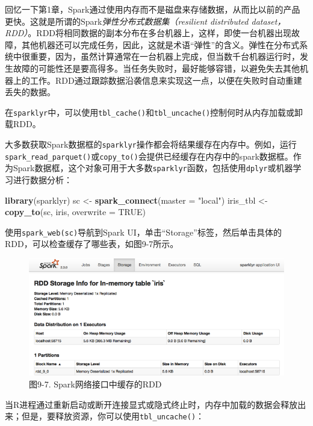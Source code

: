 \documentclass[
]{article}
\newenvironment{Shaded}{\begin{snugshade}}{\end{snugshade}}
\newcommand{\DataTypeTok}[1]{\textcolor[rgb]{0.13,0.29,0.53}{#1}}
\newcommand{\KeywordTok}[1]{\textcolor[rgb]{0.13,0.29,0.53}{\textbf{#1}}}
\newcommand{\NormalTok}[1]{#1}
\newcommand{\OtherTok}[1]{\textcolor[rgb]{0.56,0.35,0.01}{#1}}
\newcommand{\StringTok}[1]{\textcolor[rgb]{0.31,0.60,0.02}{#1}}
\begin{document}
回忆一下第1章，Spark通过使用内存而不是磁盘来存储数据，从而比以前的产品更快。这就是所谓的Spark\emph{弹性分布式数据集（resilient
distributed
dataset，RDD）}。RDD将相同数据的副本分布在多台机器上，这样，即使一台机器出现故障，其他机器还可以完成任务，因此，这就是术语``弹性''的含义。弹性在分布式系统中很重要，因为，虽然计算通常在一台机器上完成，但当数千台机器运行时，发生故障的可能性还是要高得多。当任务失败时，最好能够容错，以避免失去其他机器上的工作。RDD通过跟踪数据沿袭信息来实现这一点，以便在失败时自动重建丢失的数据。

在\texttt{sparklyr}中，可以使用\texttt{tbl\_cache()}和\texttt{tbl\_uncache()}控制何时从内存加载或卸载RDD。

大多数获取Spark数据框的\texttt{sparklyr}操作都会将结果缓存在内存中。例如，运行\texttt{spark\_read\_parquet()}或\texttt{copy\_to()}会提供已经缓存在内存中的spark数据框。作为Spark数据框，这个对象可用于大多数\texttt{sparklyr}函数，包括使用\texttt{dplyr}或机器学习进行数据分析：

\begin{Shaded}
\begin{Highlighting}[]
\KeywordTok{library}\NormalTok{(sparklyr)}
\NormalTok{sc <-}\StringTok{ }\KeywordTok{spark_connect}\NormalTok{(}\DataTypeTok{master =} \StringTok{"local"}\NormalTok{)}
\NormalTok{iris_tbl <-}\StringTok{ }\KeywordTok{copy_to}\NormalTok{(sc, iris, }\DataTypeTok{overwrite =} \OtherTok{TRUE}\NormalTok{)}
\end{Highlighting}
\end{Shaded}

使用\texttt{spark\_web(sc)}导航到Spark
UI，单击``Storage''标签，然后单击具体的RDD，可以检查缓存了哪些表，如图9-7所示。

\begin{figure}
\centering
\includegraphics{figures/9_7.png}
\caption{图9-7. Spark网络接口中缓存的RDD}
\end{figure}

当R进程通过重新启动或断开连接显式或隐式终止时，内存中加载的数据会释放出来；但是，要释放资源，你可以使用\texttt{tbl\_uncache()}：
\end{document}
